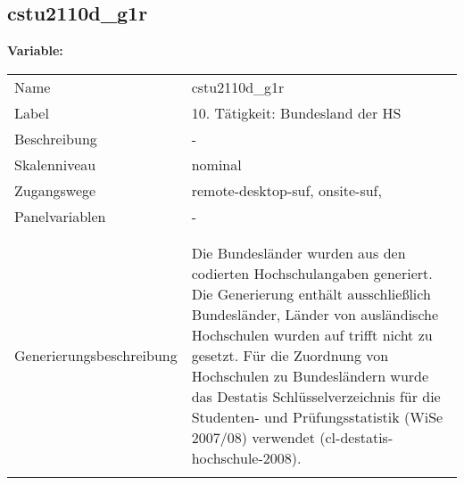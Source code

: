 	
	
	\subsection{cstu2110d\_g1r}
	\label{subSection:cstu2110d_g1r}

	\noindent\textbf{Variable:}\\
		\begin{tabular}{lL{11.3cm}}
			\label{tableVariable:cstu2110d_g1r}
			Name & cstu2110d\_g1r \\
			Label & 10. Tätigkeit: Bundesland der HS \\
			Beschreibung & - \\
			Skalenniveau & nominal \\
			Zugangswege &
				remote-desktop-suf,
				onsite-suf,
 \\
			Panelvariablen & -
			 \\
			 \\
 \\
					Generierungsbeschreibung & Die Bundesländer wurden aus den codierten Hochschulangaben generiert. Die Generierung enthält ausschließlich Bundesländer, Länder von ausländische Hochschulen wurden auf trifft nicht zu gesetzt. Für die Zuordnung von Hochschulen zu Bundesländern wurde das Destatis Schlüsselverzeichnis für die Studenten- und Prüfungsstatistik (WiSe 2007/08) verwendet (cl-destatis-hochschule-2008).
				 \\	
			 \\
		\end{tabular}






